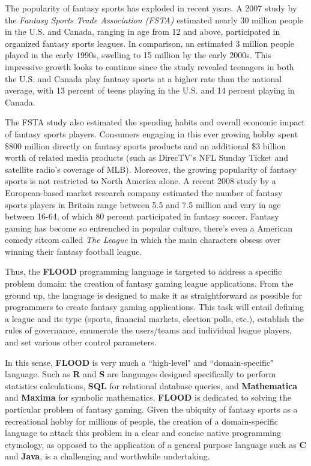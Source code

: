 \documentclass[12pt]{report}
\begin{document}
The popularity of fantasy sports has exploded in recent years. A 2007 study by the \textit{Fantasy Sports Trade Association (FSTA)} estimated  nearly 30 million people in the U.S. and Canada, ranging in age from 12 and above, participated in organized fantasy sports leagues. In comparison, an estimated 3 million people played in the early 1990s, swelling to 15 million by the early 2000s. This impressive growth looks to continue since the study revealed teenagers in both the U.S. and Canada play fantasy sports at a higher rate than the national average, with 13 percent of teens playing in the U.S. and 14 percent playing in Canada.

The FSTA study also estimated the spending habits and overall economic impact of fantasy sports players. Consumers engaging in this ever growing hobby spent \$800 million directly on fantasy sports products and an additional \$3 billion worth of related media products (such as DirecTV's NFL Sunday Ticket and satellite radio's coverage of MLB). Moreover, the growing popularity of fantasy sports is not restricted to North America alone. A recent 2008 study by a European-based market research company estimated the number of fantasy sports players in Britain range between 5.5 and 7.5 million and vary in age between 16-64, of which 80 percent participated in fantasy soccer. Fantasy gaming has become so entrenched in popular culture, there's even a American comedy sitcom called \textit{The League} in which the main characters obsess over winning their fantasy football league.

Thus, the \textbf{FLOOD} programming language is targeted to address a specific problem domain: the creation of fantasy gaming league applications. From the ground up, the language is designed to make it as straightforward as possible for programmers to create fantasy gaming applications. This task will entail defining a league and its type (sports, financial markets, election polls, etc.), establish the rules of governance, enumerate the users/teams and individual league players, and set various other control parameters. 

In this sense, \textbf{FLOOD} is very much a ``high-level" and ``domain-specific" language. Such as \textbf{R} and \textbf{S} are languages designed specifically to perform statistics calculations, \textbf{SQL} for relational database queries, and \textbf{Mathematica} and \textbf{Maxima} for symbolic mathematics, \textbf{FLOOD} is dedicated to solving the particular problem of fantasy gaming. Given the ubiquity of fantasy sports as a recreational hobby for millions of people, the creation of a domain-specific language to attack this problem in a clear and concise native programming etymology, as opposed to the application of a general purpose language such as \textbf{C} and \textbf{Java}, is a challenging and worthwhile undertaking.
\end{document}
